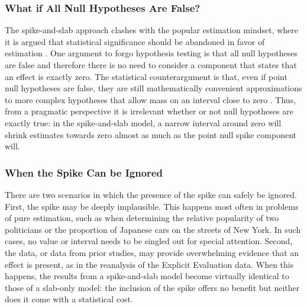 \documentclass[a4paper]{article}
\newenvironment{revision}{\color{teal}}{\color{black}}
\begin{document}
\subsubsection*{What if All Null Hypotheses Are False?}
The spike-and-slab approach clashes with the popular estimation mindset, where it is argued that statistical significance should be abandoned in favor of estimation \parencite{McShane2019abandon, Cumming2016introduction, valentine2015life, Cumming2014}. 
One argument to forgo hypothesis testing is that all null hypotheses are false \parencite{Cohen1990, Meehl1978} and therefore there is no need to consider a component that states that an effect is exactly zero. 
The statistical counterargument is that, even if point null hypotheses are false, they are still mathematically convenient approximations to more complex hypotheses that allow mass on an interval close to zero \parencite[\begin{revision}i.e., perinull hypotheses;\end{revision}][]{ly2020bayesian2, george1993variable, BergerDelampady1987}. 
Thus, from a pragmatic perspective it is irrelevant whether or not null hypotheses are exactly true: in the spike-and-slab model, a \begin{revision}narrow interval around zero\end{revision} will shrink estimates towards zero almost as much as the point null spike component will. 

\begin{revision}
\subsubsection*{When the Spike Can be Ignored}
\end{revision}
There are two scenarios in which the presence of the spike can safely be ignored.
First, the spike may be deeply implausible.
This happens most often in problems of pure estimation, such as when determining the relative popularity of two politicians or the proportion of Japanese cars on the streets of New York.
In such cases, no value or interval needs to be singled out for special attention.
Second, the data\begin{revision}, or data from prior studies,\end{revision} may provide overwhelming evidence that an effect is present\begin{revision}, as in the reanalysis of the Explicit Evaluation data.\end{revision}
When this happens, the results from a spike-and-slab model become virtually identical to those of a slab-only model: \begin{revision} the inclusion of the spike offers no benefit but neither does it come with a statistical cost.\end{revision} %
\end{document}
